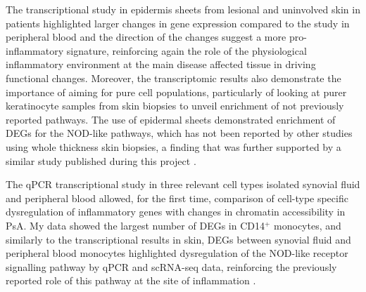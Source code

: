 The transcriptional study in epidermis sheets from lesional and uninvolved skin in patients highlighted larger changes in gene expression compared to the study in peripheral blood and the direction of the changes suggest a more pro-inflammatory signature, reinforcing again the role of the physiological inflammatory environment at the main disease affected tissue in driving functional changes. Moreover, the transcriptomic results also demonstrate the importance of aiming for pure cell populations, particularly of looking at purer keratinocyte samples from skin biopsies to unveil enrichment of not previously reported pathways. The use of epidermal sheets demonstrated enrichment of DEGs for the NOD-like pathways, which has not been reported by other studies using whole thickness skin biopsies, a finding that was further supported by a similar study published during this project \parencite{Tervaniemi2016}. 

The qPCR transcriptional study in three relevant cell types isolated synovial fluid and peripheral blood allowed, for the first time, comparison of cell-type specific dysregulation of inflammatory genes with changes in chromatin accessibility in PsA. My data showed the largest number of DEGs in CD14$^+$ monocytes, and similarly to the transcriptional results in skin, DEGs between synovial fluid and peripheral blood monocytes highlighted dysregulation of the NOD-like receptor signalling pathway by qPCR and scRNA-seq data, reinforcing the previously reported role of this pathway at the site of inflammation \parencite{McCormack2009}.


